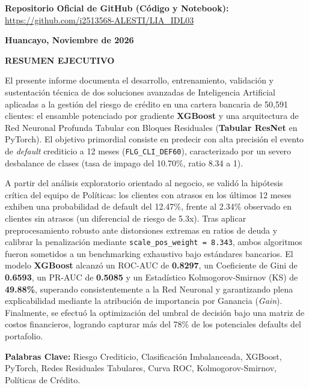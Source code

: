 \documentclass[11pt,a4paper]{article}
\begin{document}
\begin{titlepage}
    \vspace{0.8cm}
    \begin{tcolorbox}[colback=white,colframe=ContinentalBlue,arc=2mm,boxrule=0.8pt,halign=center]
        \small\textbf{\color{ContinentalBlue}Repositorio Oficial de GitHub (Código y Notebook):}\\
        \url{https://github.com/i2513568-ALESTI/LIA_IDL03}
    \end{tcolorbox}
    
    \vspace{1.5cm}
    {\large\textbf{Huancayo, Noviembre de 2026}}
\end{titlepage}

\newpage
{}

\begin{resumenbox}
\begin{center}
    {\large\bfseries\color{ContinentalBlue} RESUMEN EJECUTIVO}
\end{center}
\vspace{0.2cm}
El presente informe documenta el desarrollo, entrenamiento, validación y sustentación técnica de dos soluciones avanzadas de Inteligencia Artificial aplicadas a la gestión del riesgo de crédito en una cartera bancaria de 50,591 clientes: el ensamble potenciado por gradiente \textbf{XGBoost} y una arquitectura de Red Neuronal Profunda Tabular con Bloques Residuales (\textbf{Tabular ResNet} en PyTorch). El objetivo primordial consiste en predecir con alta precisión el evento de \textit{default} crediticio a 12 meses (\texttt{FLG\_CLI\_DEF60}), caracterizado por un severo desbalance de clases (tasa de impago del 10.70\%, ratio 8.34 a 1). 

A partir del análisis exploratorio orientado al negocio, se validó la hipótesis crítica del equipo de Políticas: los clientes con atrasos en los últimos 12 meses exhiben una probabilidad de default del 12.47\%, frente al 2.34\% observado en clientes sin atrasos (un diferencial de riesgo de 5.3x). Tras aplicar preprocesamiento robusto ante distorsiones extremas en ratios de deuda y calibrar la penalización mediante \texttt{scale\_pos\_weight = 8.343}, ambos algoritmos fueron sometidos a un benchmarking exhaustivo bajo estándares bancarios. El modelo \textbf{XGBoost} alcanzó un ROC-AUC de \textbf{0.8297}, un Coeficiente de Gini de \textbf{0.6593}, un PR-AUC de \textbf{0.5085} y un Estadístico Kolmogorov-Smirnov (KS) de \textbf{49.88\%}, superando consistentemente a la Red Neuronal y garantizando plena explicabilidad mediante la atribución de importancia por Ganancia (\textit{Gain}). Finalmente, se efectuó la optimización del umbral de decisión bajo una matriz de costos financieros, logrando capturar más del 78\% de los potenciales defaults del portafolio.

\vspace{0.3cm}
\textbf{Palabras Clave:} Riesgo Crediticio, Clasificación Imbalanceada, XGBoost, PyTorch, Redes Residuales Tabulares, Curva ROC, Kolmogorov-Smirnov, Políticas de Crédito.
\end{resumenbox}
\end{document}
